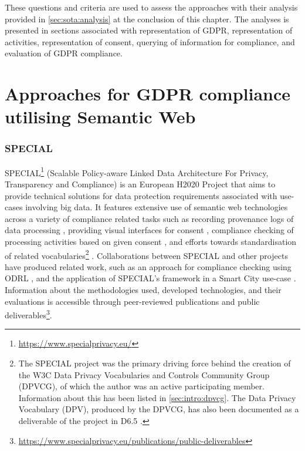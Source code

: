 These questions and criteria are used to assess the approaches with their analysis provided in \autoref{sec:sota:analysis} at the conclusion of this chapter.
The analyses is presented in sections associated with representation of GDPR, representation of activities, representation of consent, querying of information for compliance, and evaluation of GDPR compliance.

\section{Approaches for GDPR compliance utilising Semantic Web}\label{sec:sota:gdpr-semweb}

\subsubsection{SPECIAL}\label{sec:sota:SPECIAL}
SPECIAL\footnote{\url{https://www.specialprivacy.eu/}} (Scalable Policy-aware Linked Data Architecture For Privacy, Transparency and Compliance) is an European H2020 Project that aims to provide technical solutions for data protection requirements associated with use-cases involving big data. It features extensive use of semantic web technologies across a variety of compliance related tasks such as recording provenance logs of data processing \cite{kirrane_scalable_2018}, providing visual interfaces for consent \cite{drozd_consent_2019,gritzalis_i_2019}, compliance checking of processing activities based on given consent \cite{westphal_spirit_2018,vos_odrl_2019,fernandez_user_2019}, and efforts towards standardisation of related vocabularies\footnote{The SPECIAL project was the primary driving force behind the creation of the W3C Data Privacy Vocabularies and Controls Community Group (DPVCG), of which the author was an active participating member. Information about this has been listed in \autoref{sec:intro:dpvcg}. The Data Privacy Vocabulary (DPV), produced by the DPVCG, has also been documented as a deliverable of the project in D6.5 \cite{pandit_d6.5_2019}.} \cite{bonatti_data_2018,pandit_creating_2019}.
Collaborations between SPECIAL and other projects have produced related work, such as an approach for compliance checking using ODRL \cite{agarwal_legislative_2018,vos_odrl_2019}, and the application of SPECIAL's framework in a Smart City use-case \cite{fernandez_user_2019}.
Information about the methodologies used, developed technologies, and their evaluations is accessible through peer-reviewed publications and public deliverables\footnote{\url{https://www.specialprivacy.eu/publications/public-deliverables}}.

